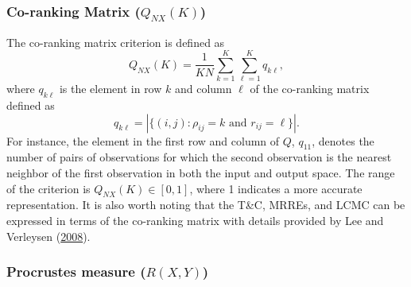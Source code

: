 \documentclass[12pt]{article}
\begin{document}
\hypertarget{co-ranking-matrix-q_nxk}{%
\subsubsection*{\texorpdfstring{Co-ranking Matrix (\(Q_{NX}(K)\))}{Co-ranking Matrix (Q\_\{NX\}(K))}}\label{co-ranking-matrix-q_nxk}}

The co-ranking matrix criterion is defined as
\begin{equation}\label{eq:Q_NX}
  Q_{NX}(K)=\frac{1}{K N} \sum_{k=1}^{K} \sum_{\ell=1}^{K} q_{k\ell},
\end{equation}
where \(q_{k\ell}\) is the element in row \(k\) and column \(\ell\) of the co-ranking matrix defined as
\begin{equation}\label{eq:coRanking}
  q_{k\ell}=|\{(i, j): \rho_{i j}=k \text { and } r_{i j}=\ell\}|.
\end{equation}
For instance, the element in the first row and column of \(Q\), \(q_{11}\), denotes the number of pairs of observations for which the second observation is the nearest neighbor of the first observation in both the input and output space. The range of the criterion is \(Q_{N X}(K) \in[0,1]\), where 1 indicates a more accurate representation. It is also worth noting that the T\&C, MRREs, and LCMC can be expressed in terms of the co-ranking matrix with details provided by Lee and Verleysen (\protect\hyperlink{ref-Lee2008-cx}{2008}).

\hypertarget{procrustes-measure-rxy}{%
\subsubsection*{\texorpdfstring{Procrustes measure (\(R(X,Y)\))}{Procrustes measure (R(X,Y))}}\label{procrustes-measure-rxy}}
\end{document}
